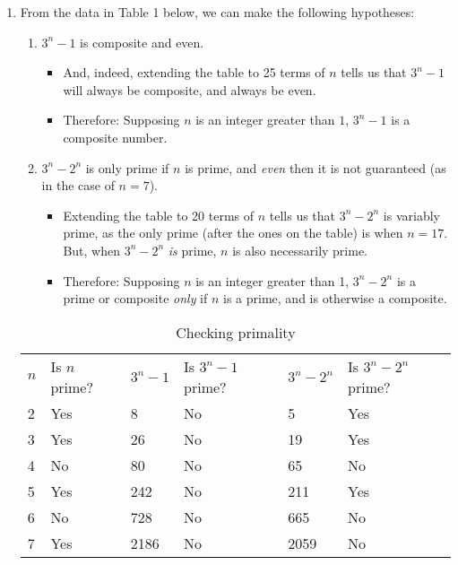 \documentclass[a4paper, 11pt]{article}
\begin{document}
\begin{enumerate}
  \item From the data in Table 1 below, we can make the following hypotheses:
        \begin{enumerate}
          \item $3^n-1$ is composite and even.
                \begin{itemize}
                  \item And, indeed, extending the table to 25 terms of $n$ tells us that $3^n - 1$ will always be composite, and always be even.
                  \item Therefore: Supposing $n$ is an integer greater than $1$, $3^n-1$ is a composite number.
                \end{itemize}
          \item $3^n-2^n$ is only prime if $n$ is prime, and \textit{even} then it is not guaranteed (as in the case of $n=7$).
                \begin{itemize}
                  \item Extending the table to 20 terms of $n$ tells us that $3^n - 2^n$ is variably prime, as the only prime (after the ones on the table) is when $n=17$. But, when $3^n-2^n$ \textit{is} prime, $n$ is also necessarily prime.
                  \item Therefore: Supposing $n$ is an integer greater than 1, $3^n-2^n$ is a prime or composite \textit{only} if $n$ is a prime, and is otherwise a composite.
                \end{itemize}
        \end{enumerate}
        \begin{table}[h]
          \centering
          \begin{tabular}{llllll}
            $n$               &
            Is $n$ prime?     &
            $3^n-1$           &
            Is $3^n-1$ prime? &
            $3^n-2^n$         &
            Is $3^n-2^n$ prime?                              \\
            2                 & Yes & 8    & No & 5    & Yes \\
            3                 & Yes & 26   & No & 19   & Yes \\
            4                 & No  & 80   & No & 65   & No  \\
            5                 & Yes & 242  & No & 211  & Yes \\
            6                 & No  & 728  & No & 665  & No  \\
            7                 & Yes & 2186 & No & 2059 & No  \\
          \end{tabular}
          \caption{Checking primality}
        \end{table}


\end{enumerate}
\end{document}
